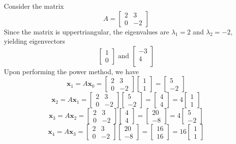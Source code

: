 \documentclass[letterpaper,12pt]{article}
\theoremstyle{definition}
\begin{document}
Consider the matrix
\[A=\begin{bmatrix}
2 & 3\\
0&-2
\end {bmatrix}\]
Since the matrix is uppertriangular, the eigenvalues are  $\lambda_1=2$ and $\lambda_2=-2$, yielding eigenvectors 
\[\begin{bmatrix}
1\\
0
\end {bmatrix} \text{ and }
\begin{bmatrix}
-3\\
4\\
\end {bmatrix}\]
Upon performing the power method, we have
\[\textbf{x}_1=A\textbf{x}_0=
\begin{bmatrix}
2 & 3\\
0&-2
\end{bmatrix}
\begin{bmatrix}
1\\
1
\end{bmatrix}=
\begin{bmatrix}
5\\
-2
\end{bmatrix}
\]
\[\textbf{x}_2=A\textbf{x}_1=
\begin{bmatrix}
2 & 3\\
0&-2
\end{bmatrix}
\begin{bmatrix}
5\\
-2
\end{bmatrix}=
\begin{bmatrix}
4\\
4
\end{bmatrix}=4
\begin{bmatrix}
1\\
1
\end{bmatrix}
\]
\[\textbf{x}_3=A\textbf{x}_2=
\begin{bmatrix}
2 & 3\\
0&-2
\end{bmatrix}
\begin{bmatrix}
4\\
4
\end{bmatrix}=
\begin{bmatrix}
20\\
-8
\end{bmatrix}=4
\begin{bmatrix}
5\\
-2
\end{bmatrix}
\]
\[\textbf{x}_4=A\textbf{x}_3=
\begin{bmatrix}
2 & 3\\
0&-2
\end{bmatrix}
\begin{bmatrix}
20\\
-8
\end{bmatrix}=
\begin{bmatrix}
16\\
16
\end{bmatrix}=16
\begin{bmatrix}
1\\
1
\end{bmatrix}
\]
\end{document}
